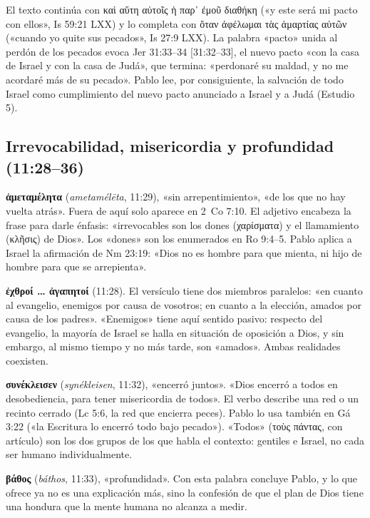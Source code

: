 \documentclass[11pt,letterpaper]{article}
\newcommand{\grc}[1]{\foreignlanguage{ancientgreek}{#1}}
\begin{document}
El texto continúa con \grc{καὶ αὕτη αὐτοῖς ἡ παρ᾿ ἐμοῦ διαθήκη} («y este será mi pacto con ellos», Is 59:21 LXX) y lo completa con \grc{ὅταν ἀφέλωμαι τὰς ἁμαρτίας αὐτῶν} («cuando yo quite sus pecados», Is 27:9 LXX). La palabra «pacto» unida al perdón de los pecados evoca Jer 31:33--34 [31:32--33], el nuevo pacto «con la casa de Israel y con la casa de Judá», que termina: «perdonaré su maldad, y no me acordaré más de su pecado». Pablo lee, por consiguiente, la salvación de todo Israel como cumplimiento del nuevo pacto anunciado a Israel y a Judá (Estudio 5).

\subsection{Irrevocabilidad, misericordia y profundidad (11:28--36)}

\textbf{\grc{ἀμεταμέλητα}} (\emph{ametamélēta}, 11:29), «sin arrepentimiento», «de los que no hay vuelta atrás». Fuera de aquí solo aparece en 2~Co 7:10. El adjetivo encabeza la frase para darle énfasis: «irrevocables son los dones (\grc{χαρίσματα}) y el llamamiento (\grc{κλῆσις}) de Dios». Los «dones» son los enumerados en Ro 9:4--5. Pablo aplica a Israel la afirmación de Nm 23:19: «Dios no es hombre para que mienta, ni hijo de hombre para que se arrepienta».

\textbf{\grc{ἐχθροί … ἀγαπητοί}} (11:28). El versículo tiene dos miembros paralelos: «en cuanto al evangelio, enemigos por causa de vosotros; en cuanto a la elección, amados por causa de los padres». «Enemigos» tiene aquí sentido pasivo: respecto del evangelio, la mayoría de Israel se halla en situación de oposición a Dios, y sin embargo, al mismo tiempo y no más tarde, son «amados». Ambas realidades coexisten.

\textbf{\grc{συνέκλεισεν}} (\emph{synékleisen}, 11:32), «encerró juntos». «Dios encerró a todos en desobediencia, para tener misericordia de todos». El verbo describe una red o un recinto cerrado (Lc 5:6, la red que encierra peces). Pablo lo usa también en Gá 3:22 («la Escritura lo encerró todo bajo pecado»). «Todos» (\grc{τοὺς πάντας}, con artículo) son los dos grupos de los que habla el contexto: gentiles e Israel, no cada ser humano individualmente.

\textbf{\grc{βάθος}} (\emph{báthos}, 11:33), «profundidad». Con esta palabra concluye Pablo, y lo que ofrece ya no es una explicación más, sino la confesión de que el plan de Dios tiene una hondura que la mente humana no alcanza a medir.
\end{document}
